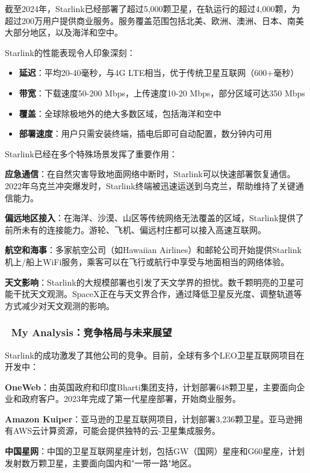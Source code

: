 截至2024年，Starlink已经部署了超过5,000颗卫星，在轨运行的超过4,000颗，为超过200万用户提供商业服务。服务覆盖范围包括北美、欧洲、澳洲、日本、南美大部分地区，以及海洋和空中。

Starlink的性能表现令人印象深刻：

\begin{itemize}
    \item \textbf{延迟}：平均20-40毫秒，与4G LTE相当，优于传统卫星互联网（600+毫秒）
    \item \textbf{带宽}：下载速度50-200 Mbps，上传速度10-20 Mbps，部分区域可达350 Mbps
    \item \textbf{覆盖}：全球除极地外的绝大多数区域，包括海洋和空中
    \item \textbf{部署速度}：用户只需安装终端，插电后即可自动配置，数分钟内可用
\end{itemize}

Starlink已经在多个特殊场景发挥了重要作用：

\textbf{应急通信}：在自然灾害导致地面网络中断时，Starlink可以快速部署恢复通信。2022年乌克兰冲突爆发时，Starlink终端被迅速运送到乌克兰，帮助维持了关键通信能力。

\textbf{偏远地区接入}：在海洋、沙漠、山区等传统网络无法覆盖的区域，Starlink提供了前所未有的连接能力。游轮、飞机、偏远村庄都可以接入高速互联网。

\textbf{航空和海事}：多家航空公司（如Hawaiian Airlines）和邮轮公司开始提供Starlink机上/船上WiFi服务，乘客可以在飞行或航行中享受与地面相当的网络体验。

\textbf{天文影响}：Starlink的大规模部署也引发了天文学界的担忧。数千颗明亮的卫星可能干扰天文观测。SpaceX正在与天文界合作，通过降低卫星反光度、调整轨道等方式减少对天文观测的影响。

\subsubsection{🧠 My Analysis：竞争格局与未来展望}

Starlink的成功激发了其他公司的竞争。目前，全球有多个LEO卫星互联网项目在开发中：

\textbf{OneWeb}：由英国政府和印度Bharti集团支持，计划部署648颗卫星，主要面向企业和政府客户。2023年完成了第一代星座部署，开始商业服务。

\textbf{Amazon Kuiper}：亚马逊的卫星互联网项目，计划部署3,236颗卫星。亚马逊拥有AWS云计算资源，可能会提供独特的云-卫星集成服务。

\textbf{中国星网}：中国的卫星互联网星座计划，包括GW（国网）星座和G60星座，计划发射数万颗卫星，主要面向国内和"一带一路"地区。

